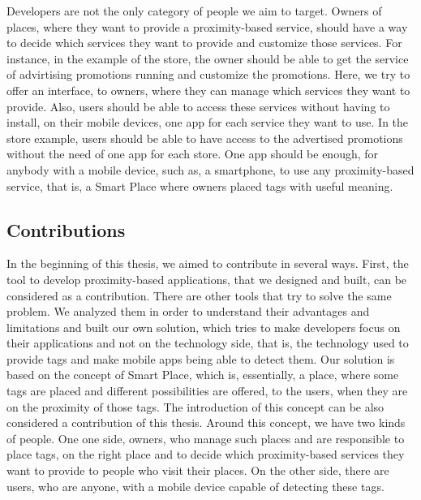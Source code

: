 Developers are not the only category of people we aim to target.
Owners of places, where they want to provide a proximity-based service, should have a way to decide which services they want to provide and customize those services.
For instance, in the example of the store, the owner should be able to get the service of advirtising promotions running and customize the promotions.
Here, we try to offer an interface, to owners, where they can manage which services they want to provide.
Also, users should be able to access these services without having to install, on their mobile devices, one app for each service they want to use.
In the store example, users should be able to have access to the advertised promotions without the need of one app for each store.
One app should be enough, for anybody with a mobile device, such as, a smartphone, to use any proximity-based service, that is, a Smart Place where owners placed tags with useful meaning.

\subsection{Contributions}
\label{sec:introduction_contributions}
In the beginning of this thesis, we aimed to contribute in several ways.
First, the tool to develop proximity-based applications, that we designed and built, can be considered as a contribution.
There are other tools that try to solve the same problem.
We analyzed them in order to understand their advantages and limitations and built our own solution, which tries to make developers focus on their applications and not on the technology side, that is, the technology used to provide tags and make mobile apps being able to detect them.
Our solution is based on the concept of Smart Place, which is, essentially, a place, where some tags are placed and different possibilities are offered, to the users, when they are on the proximity of those tags.
The introduction of this concept can be also considered a contribution of this thesis.
Around this concept, we have two kinds of people.
One one side, owners, who manage such places and are responsible to place tags, on the right place and to decide which proximity-based services they want to provide to people who visit their places.
On the other side, there are users, who are anyone, with a mobile device capable of detecting these tags.

